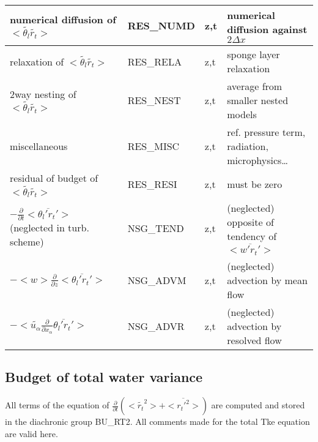\begin{longtable}[c]{|p{}|p{}|p{}|p{}|}
{\rm numerical diffusion of } $<\tilde{\theta_l}\tilde{r_t}>$       & RES\_NUMD & z,t & numerical diffusion against $2\Delta x$ \\\hline
{\rm relaxation of }$<\tilde{\theta_l}\tilde{r_t}>$                 & RES\_RELA & z,t & sponge layer relaxation \\\hline
{\rm 2way nesting of }$<\tilde{\theta_l}\tilde{r_t}>$               & RES\_NEST & z,t & average from smaller nested models \\\hline
{\rm miscellaneous}                                                 & RES\_MISC & z,t & ref. pressure term, radiation, microphysics\ldots \\\hline
{\rm residual of budget of} $<\tilde{\theta_l}\tilde{r_t}>$         & RES\_RESI & z,t & must be zero \\\hline
$-\frac{\partial }{\partial t}<\overline{\theta_l'r_t'}>$ (neglected in turb. scheme) & NSG\_TEND & z,t & (neglected) opposite of tendency of $<\overline{w'r_t'}>$ \\\hline
$-<w>\frac{\partial}{\partial z}<\overline{\theta_l'r_t'}>$         & NSG\_ADVM & z,t & (neglected) advection by mean flow \\\hline
$-<\tilde{u_\alpha}\frac{\partial}{\partial x_\alpha}\overline{\theta_l'r_t'}>$  & NSG\_ADVR & z,t & (neglected) advection by resolved flow \\\hline
\end{longtable}
\endgroup


\subsection{Budget of total water variance}


All terms of the equation of $\frac{\partial}{\partial t} (<\tilde{r_t}^2> + <\overline{r_t'^2}>)$ are
computed and stored in the diachronic group BU\_RT2. 
All comments made for the total Tke equation are valid here.\\

